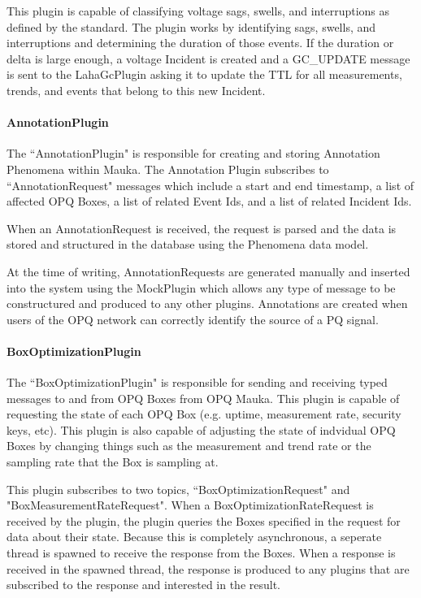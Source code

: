This plugin is capable of classifying voltage sags, swells, and interruptions as defined by the standard. The plugin works by identifying sags, swells, and interruptions and determining the duration of those events. If the duration or delta is large enough, a voltage Incident is created and a GC\_UPDATE message is sent to the LahaGcPlugin asking it to update the TTL for all measurements, trends, and events that belong to this new Incident.

\paragraph{AnnotationPlugin}

The ``AnnotationPlugin" is responsible for creating and storing Annotation Phenomena within Mauka. The Annotation Plugin subscribes to ``AnnotationRequest" messages which include a start and end timestamp, a list of affected OPQ Boxes, a list of related Event Ids, and a list of related Incident Ids.

When an AnnotationRequest is received, the request is parsed and the data is stored and structured in the database using the Phenomena data model.

At the time of writing, AnnotationRequests are generated manually and inserted into the system using the MockPlugin which allows any type of message to be constructured and produced to any other plugins. Annotations are created when users of the OPQ network can correctly identify the source of a PQ signal.

\paragraph{BoxOptimizationPlugin}

The ``BoxOptimizationPlugin" is responsible for sending and receiving typed messages to and from OPQ Boxes from OPQ Mauka. This plugin is capable of requesting the state of each OPQ Box (e.g. uptime, measurement rate, security keys, etc). This plugin is also capable of adjusting the state of indvidual OPQ Boxes by changing things such as the measurement and trend rate or the sampling rate that the Box is sampling at.

This plugin subscribes to two topics, ``BoxOptimizationRequest" and "BoxMeasurementRateRequest". When a BoxOptimizationRateRequest is received by the plugin, the plugin queries the Boxes specified in the request for data about their state. Because this is completely asynchronous, a seperate thread is spawned to receive the response from the Boxes. When a response is received in the spawned thread, the response is produced to any plugins that are subscribed to the response and interested in the result.

